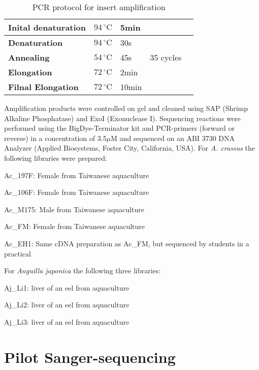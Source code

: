 \begin{table}[h]
  \centering
  \begin{tabular}{lllll} 
    \textbf{Inital denaturation} &  $ 94\, ^{\circ}\mathrm{C} $ & 5min &  &\\ 
    \hline
    \textbf{Denaturation} &  $ 94\, ^{\circ}\mathrm{C} $ &30s& & \\ 
    \textbf{Annealing} &   $ 54\, ^{\circ}\mathrm{C} $ & 45s & 35 cycles &\\ 
    \textbf{Elongation} &   $ 72\, ^{\circ}\mathrm{C} $ & 2min &  &\\ 
    \hline
    \textbf{Filnal Elongation} &   $ 72\, ^{\circ}\mathrm{C} $ & 10min &\\ 
  \end{tabular}   
  \caption{PCR protocol for insert amplification}
  \label{tab:PCR}
\end{table}

Amplification products were controlled on gel and cleaned using SAP
(Shrimp Alkaline Phosphatase) and ExoI (Exonuclease I). Sequencing
reactions were performed using the BigDye-Terminator kit and
PCR-primers (forward or reverse) in a concentration of 3.5$\mu$M and
sequenced on an ABI 3730 DNA Analyzer (Applied Biosystems, Foster
City, California, USA).  For \textit{A. crassus} the following
libraries were prepared:
 
\begin{description}
\item{Ac\_197F:} Female from Taiwanese aquaculture
\item{Ac\_106F:} Female from Taiwanese aquaculture
\item{Ac\_M175:} Male from Taiwanese aquaculture
\item{Ac\_FM:} Female from Taiwanese aquaculture
\item{Ac\_EH1:} Same cDNA preparation as Ac\_FM, but sequenced by
  students in a practical
\end{description}

For \textit{Anguilla japonica} the following three libraries:
\begin{description}
\item{Aj\_Li1:} liver of an eel from aquaculture
\item{Aj\_Li2:} liver of an eel from aquaculture
\item{Aj\_Li3:} liver of an eel from aquaculture
\end{description}

\section{Pilot Sanger-sequencing}

